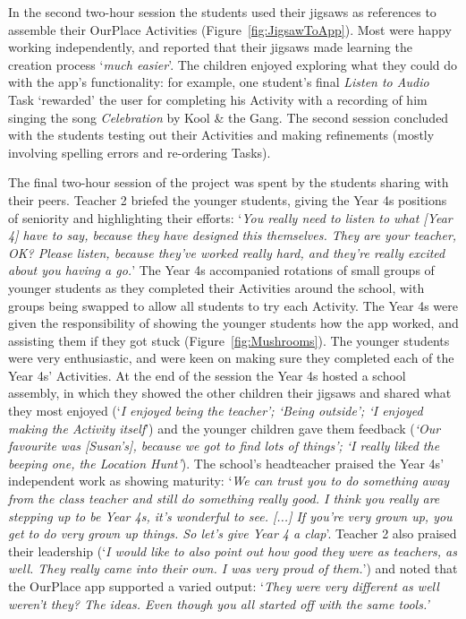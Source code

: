 \documentclass[,hyphens]{sigchi}
\begin{document}
In the second two-hour session the students used their jigsaws as references to assemble their OurPlace Activities (Figure~\ref{fig:JigsawToApp}). Most were happy working independently, and reported that their jigsaws made learning the creation process `\textit{much easier}'. The children enjoyed exploring what they could do with the app's functionality: for example, one student's final \textit{Listen to Audio} Task `rewarded' the user for completing his Activity with a recording of him singing the song \textit{Celebration} by Kool \& the Gang. The second session concluded with the students testing out their Activities and making refinements (mostly involving spelling errors and re-ordering Tasks). 

The final two-hour session of the project was spent by the students sharing with their peers. Teacher 2 briefed the younger students, giving the Year 4s positions of seniority and highlighting their efforts: `\textit{You really need to listen to what [Year 4] have to say, because they have designed this themselves. They are your teacher, OK? Please listen, because they've worked really hard, and they're really excited about you having a go.}' The Year 4s accompanied rotations of small groups of younger students as they completed their Activities around the school, with groups being swapped to allow all students to try each Activity. The Year 4s were given the responsibility of showing the younger students how the app worked, and assisting them if they got stuck (Figure~\ref{fig:Mushrooms}). The younger students were very enthusiastic, and were keen on making sure they completed each of the Year 4s' Activities. At the end of the session the Year 4s hosted a school assembly, in which they showed the other children their jigsaws and shared what they most enjoyed (`\textit{I enjoyed being the teacher'; `Being outside'; `I enjoyed making the Activity itself}') and the younger children gave them feedback (\textit{`Our favourite was [Susan's], because we got to find lots of things'; `I really liked the beeping one, the Location Hunt'}). The school's headteacher praised the Year 4s' independent work as showing maturity: `\textit{We can trust you to do something away from the class teacher and still do something really good. I think you really are stepping up to be Year 4s, it's wonderful to see. [...] If you're very grown up, you get to do very grown up things. So let's give Year 4 a clap}'. Teacher 2 also praised their leadership (`\textit{I would like to also point out how good they were as teachers, as well. They really came into their own. I was very proud of them.}') and noted that the OurPlace app supported a varied output: `\textit{They were very different as well weren't they? The ideas. Even though you all started off with the same tools.'}
\end{document}
